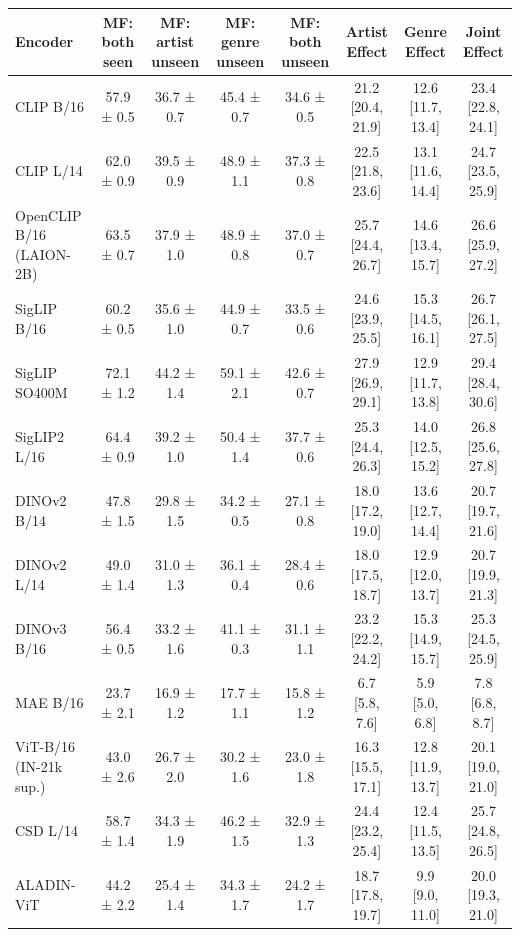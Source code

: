 \begin{tabular}{lccccccc}
\toprule
Encoder & MF: both seen & MF: artist unseen & MF: genre unseen & MF: both unseen & Artist Effect & Genre Effect & Joint Effect \\
\midrule
CLIP B/16 & 57.9 ± 0.5 & 36.7 ± 0.7 & 45.4 ± 0.7 & 34.6 ± 0.5 & 21.2 [20.4, 21.9] & 12.6 [11.7, 13.4] & 23.4 [22.8, 24.1] \\
CLIP L/14 & 62.0 ± 0.9 & 39.5 ± 0.9 & 48.9 ± 1.1 & 37.3 ± 0.8 & 22.5 [21.8, 23.6] & 13.1 [11.6, 14.4] & 24.7 [23.5, 25.9] \\
OpenCLIP B/16 (LAION-2B) & 63.5 ± 0.7 & 37.9 ± 1.0 & 48.9 ± 0.8 & 37.0 ± 0.7 & 25.7 [24.4, 26.7] & 14.6 [13.4, 15.7] & 26.6 [25.9, 27.2] \\
SigLIP B/16 & 60.2 ± 0.5 & 35.6 ± 1.0 & 44.9 ± 0.7 & 33.5 ± 0.6 & 24.6 [23.9, 25.5] & 15.3 [14.5, 16.1] & 26.7 [26.1, 27.5] \\
SigLIP SO400M & 72.1 ± 1.2 & 44.2 ± 1.4 & 59.1 ± 2.1 & 42.6 ± 0.7 & 27.9 [26.9, 29.1] & 12.9 [11.7, 13.8] & 29.4 [28.4, 30.6] \\
SigLIP2 L/16 & 64.4 ± 0.9 & 39.2 ± 1.0 & 50.4 ± 1.4 & 37.7 ± 0.6 & 25.3 [24.4, 26.3] & 14.0 [12.5, 15.2] & 26.8 [25.6, 27.8] \\
DINOv2 B/14 & 47.8 ± 1.5 & 29.8 ± 1.5 & 34.2 ± 0.5 & 27.1 ± 0.8 & 18.0 [17.2, 19.0] & 13.6 [12.7, 14.4] & 20.7 [19.7, 21.6] \\
DINOv2 L/14 & 49.0 ± 1.4 & 31.0 ± 1.3 & 36.1 ± 0.4 & 28.4 ± 0.6 & 18.0 [17.5, 18.7] & 12.9 [12.0, 13.7] & 20.7 [19.9, 21.3] \\
DINOv3 B/16 & 56.4 ± 0.5 & 33.2 ± 1.6 & 41.1 ± 0.3 & 31.1 ± 1.1 & 23.2 [22.2, 24.2] & 15.3 [14.9, 15.7] & 25.3 [24.5, 25.9] \\
MAE B/16 & 23.7 ± 2.1 & 16.9 ± 1.2 & 17.7 ± 1.1 & 15.8 ± 1.2 & 6.7 [5.8, 7.6] & 5.9 [5.0, 6.8] & 7.8 [6.8, 8.7] \\
ViT-B/16 (IN-21k sup.) & 43.0 ± 2.6 & 26.7 ± 2.0 & 30.2 ± 1.6 & 23.0 ± 1.8 & 16.3 [15.5, 17.1] & 12.8 [11.9, 13.7] & 20.1 [19.0, 21.0] \\
CSD L/14 & 58.7 ± 1.4 & 34.3 ± 1.9 & 46.2 ± 1.5 & 32.9 ± 1.3 & 24.4 [23.2, 25.4] & 12.4 [11.5, 13.5] & 25.7 [24.8, 26.5] \\
ALADIN-ViT & 44.2 ± 2.2 & 25.4 ± 1.4 & 34.3 ± 1.7 & 24.2 ± 1.7 & 18.7 [17.8, 19.7] & 9.9 [9.0, 11.0] & 20.0 [19.3, 21.0] \\
\bottomrule
\end{tabular}
